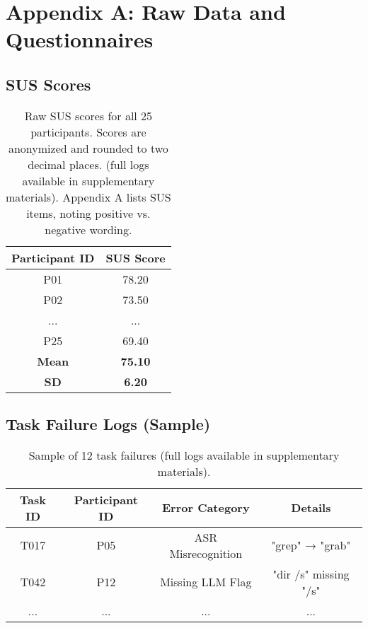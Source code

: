 \documentclass[a4paper,12pt]{article}
\begin{document}
\clearpage
{}
\setcounter{page}{1} %
\appendix

\section*{Appendix A: Raw Data and Questionnaires}
\label{app:rawdata}

\subsection*{SUS Scores}
\begin{table}[h!]
\centering
\begin{tabular}{|c|c|}
\hline
\textbf{Participant ID} & \textbf{SUS Score} \\
\hline
P01 & 78.20 \\
P02 & 73.50 \\
... & ... \\
P25 & 69.40 \\
\hline
\textbf{Mean} & \textbf{75.10} \\
\textbf{SD} & \textbf{6.20} \\
\hline
\end{tabular}
\caption{Raw SUS scores for all 25 participants. Scores are anonymized and rounded to two decimal places. (full logs available in supplementary materials). Appendix A lists SUS items, noting positive vs. negative wording.}
\end{table}

\subsection*{Task Failure Logs (Sample)}
\begin{table}[h!]
\centering
\begin{tabular}{|c|c|c|c|}
\hline
\textbf{Task ID} & \textbf{Participant ID} & \textbf{Error Category} & \textbf{Details} \\
\hline
T017 & P05 & ASR Misrecognition & "grep" → "grab" \\
T042 & P12 & Missing LLM Flag & "dir /s" missing "/s" \\
... & ... & ... & ... \\
\hline
\end{tabular}
\caption{Sample of 12 task failures (full logs available in supplementary materials).}
\end{table}
\end{document}
